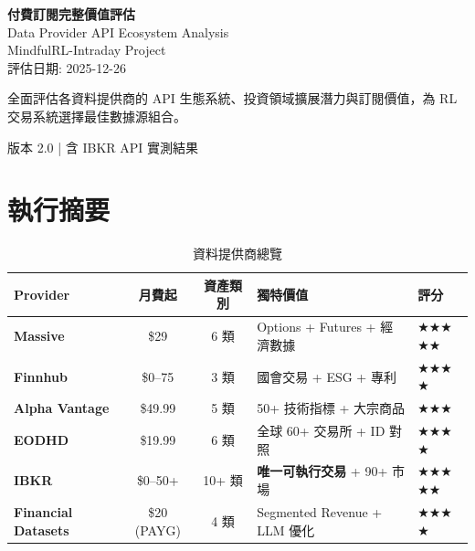 \documentclass[11pt,a4paper]{article}
\newcommand{\starmark}{\textcolor{warningyellow}{$\bigstar$}}
\begin{document}
\begin{titlepage}
\centering
\vspace*{3cm}
{\Huge\bfseries 付費訂閱完整價值評估\\[0.5cm]}
{\Large Data Provider API Ecosystem Analysis}\\[2cm]
{\large MindfulRL-Intraday Project}\\[1cm]
{\large 評估日期: 2025-12-26}\\[3cm]

\begin{tcolorbox}[colback=ibkrblue!5,colframe=ibkrblue,title={\textbf{文件目的}}]
全面評估各資料提供商的 API 生態系統、投資領域擴展潛力與訂閱價值，為 RL 交易系統選擇最佳數據源組合。
\end{tcolorbox}

\vfill
{\small 版本 2.0 | 含 IBKR API 實測結果}
\end{titlepage}

\tableofcontents
\newpage

\section{執行摘要}

\begin{table}[H]
\centering
\caption{資料提供商總覽}
\begin{tabular}{@{}lccll@{}}
\toprule
\textbf{Provider} & \textbf{月費起} & \textbf{資產類別} & \textbf{獨特價值} & \textbf{評分} \\
\midrule
\textbf{Massive} & \$29 & 6 類 & Options + Futures + 經濟數據 & \starmark\starmark\starmark\starmark\starmark \\
\textbf{Finnhub} & \$0--75 & 3 類 & 國會交易 + ESG + 專利 & \starmark\starmark\starmark\starmark \\
\textbf{Alpha Vantage} & \$49.99 & 5 類 & 50+ 技術指標 + 大宗商品 & \starmark\starmark\starmark \\
\textbf{EODHD} & \$19.99 & 6 類 & 全球 60+ 交易所 + ID 對照 & \starmark\starmark\starmark\starmark \\
\textbf{IBKR} & \$0--50+ & 10+ 類 & \textbf{唯一可執行交易} + 90+ 市場 & \starmark\starmark\starmark\starmark\starmark \\
\textbf{Financial Datasets} & \$20 (PAYG) & 4 類 & Segmented Revenue + LLM 優化 & \starmark\starmark\starmark\starmark \\
\bottomrule
\end{tabular}
\end{table}
\end{document}
